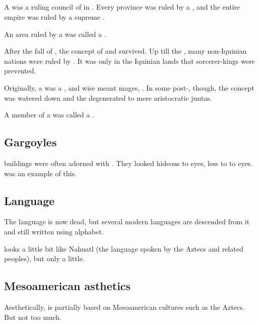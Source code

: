 \subsection{\Baccons}
\index{\bacconate}
\index{\baccon}
A \baccon was a ruling council of \rethyaxes in \Ortaica. 
Every \Ortaican province was ruled by a \baccon, and the entire \Ortaican empire was ruled by a supreme \baccon. 

An area ruled by a \baccon{} was called a \bacconate. 

After the fall of \Ortaica, the concept of \baccons and \bacconates survived. 
Up till the \thirdbanewar, many non-Iquinian nations were ruled by \rethyaxes.
It was only in the Iquinian lands that sorcerer-kings were prevented. 

Originally, a \baccon was a , and wise meant mages, \rethyaxes.
In some post-\Ortaican \bacconates, though, the concept was watered down and the \baccons degenerated to mere aristocratic juntas. 

A member of a \baccon{} was called a .





\subsection{Gargoyles}
\Ortaican buildings were often adorned with .
They looked hideous to \human eyes, less to to \scathaese eyes.
\Forclin was an example of this.





\subsection{Language}
The \Ortaican{} language is now dead, but several modern languages are descended from it and still written using \Ortaican{} alphabet. 

\Ortaican looks a little bit like Nahuatl (the language spoken by the Aztecs and related peoples), but only a little.





\subsection{Mesoamerican asthetics}
Aesthetically, \Ortaica is partially based on Mesoamerican cultures such as the Aztecs.
But not too much.









